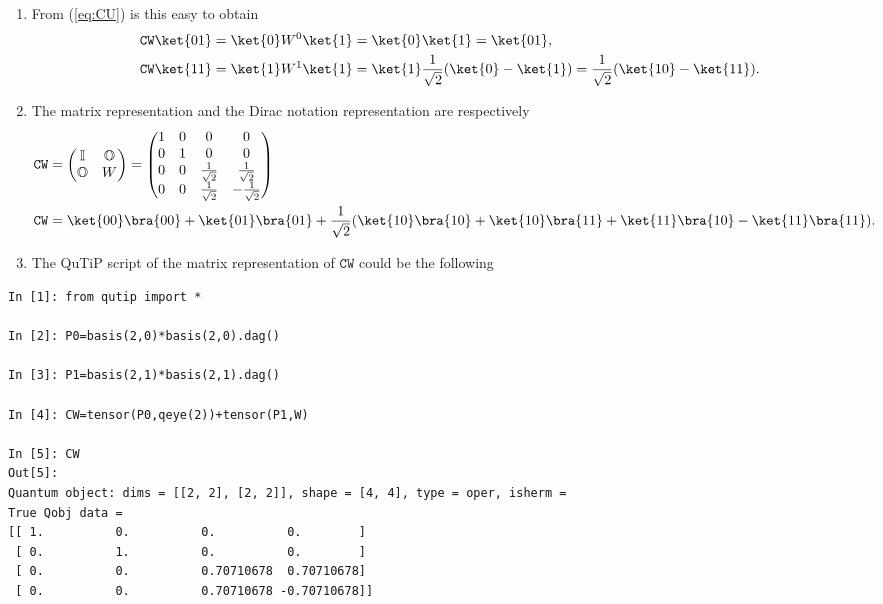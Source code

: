 \begin{footnotesize}
\begin{solution}
\begin{enumerate}
\item From (\ref{eq:CU}) is this easy to obtain
\begin{subequations}
\begin{align}
\mathtt{CW}\ket{01} & =\ket{0}W^0 \ket{1}=\ket{0}\ket{1}=\ket{01},\\
\mathtt{CW}\ket{11} & =\ket{1}W^1 \ket{1}=\ket{1}\frac{1}{\sqrt{2}}
(\ket{0}-\ket{1})= \frac{1}{\sqrt{2}}(\ket{10}-\ket{11}).
\end{align}
\end{subequations}
\item The matrix representation and the Dirac notation representation are
respectively
\begin{subequations}
\begin{align}
 \mathtt{CW} & =\begin{pmatrix}\mathbb{I} & \mathbb{O}\\
 \mathbb{O} & W\end{pmatrix}
=\begin{pmatrix} 1 & 0 & 0 & 0\\0 & 1 & 0 & 0\\
     0 & 0 & \frac{1}{\sqrt{2}} & \frac{1}{\sqrt{2}}\\
     0 & 0 & \frac{1}{\sqrt{2}} & -\frac{1}{\sqrt{2}}
    \end{pmatrix}\\
\mathtt{CW} &
=\ket{00}\bra{00}+\ket{01}\bra{01}+\frac{1}{\sqrt{2}}(\ket{10}\bra{10}+
\ket{10}\bra{11}+\ket{11}\bra{10}-\ket{11}\bra{11}).
\end{align}
\end{subequations}
\item The QuTiP script of the matrix representation of $\mathtt{CW}$ could be 
the following
\end{enumerate}
\end{solution}

\begin{lstlisting}
In [1]: from qutip import *

In [2]: P0=basis(2,0)*basis(2,0).dag()

In [3]: P1=basis(2,1)*basis(2,1).dag()

In [4]: CW=tensor(P0,qeye(2))+tensor(P1,W)

In [5]: CW
Out[5]: 
Quantum object: dims = [[2, 2], [2, 2]], shape = [4, 4], type = oper, isherm = 
True Qobj data =
[[ 1.          0.          0.          0.        ]
 [ 0.          1.          0.          0.        ]
 [ 0.          0.          0.70710678  0.70710678]
 [ 0.          0.          0.70710678 -0.70710678]]
\end{lstlisting}

\end{footnotesize}

